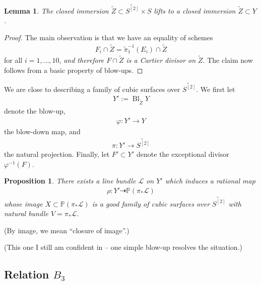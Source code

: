 \documentclass[12 pt]{amsart}
\newtheorem{lemma}{Lemma}[section]
\newtheorem{proposition}{Proposition}[section]
\renewcommand{\P}{\mathbb{P}}
\newcommand{\<}{\left\langle}
\renewcommand{\>}{\right\rangle}
\DeclareMathOperator{\Bl}{Bl}
\begin{document}
\begin{lemma}
  The closed immersion
  $\widetilde{Z} \subset \widetilde{S^{[2]}} \times S$ lifts to a
  closed immersion $\widetilde{Z} \subset Y$.
\end{lemma}

\begin{proof}
  The main observation is that we have an equality of schemes
  \begin{align}
    \label{eq:Cartier}
    F_i \cap \widetilde{Z} = \widetilde{\pi}_{1}^{-1}(E_i) \cap \widetilde{Z}
  \end{align}
  for all $i=1, \dots, 10$, {\sl and therefore $F \cap \widetilde{Z}$
    is a Cartier divisor on $\widetilde{Z}$}. The claim now follows
  from a basic property of blow-ups.
\end{proof}



We are close to describing a family of cubic surfaces over
$\widetilde{S^{[2]}}$.  We first let
\begin{align}
  \label{eq:XB3}
  Y' := \Bl_{\widetilde{Z}}Y
\end{align}
denote the blow-up,
\begin{align}
  \label{eq:phiB3}
  \varphi: Y' \to Y
\end{align}
the blow-down map, and
\begin{align}
  \label{eq:piB3}
  \pi: Y' \to \widetilde{S^{[2]}}
\end{align}
the natural projection. Finally, let $F' \subset Y'$ denote the
exceptional divisor $\varphi^{-1}(F)$.
\begin{proposition}
  \label{proposition:resolv-b3}
  There exists a line bundle $\mathcal{L}$ on $Y'$ which induces a
  rational map
  \begin{align*}
    \rho: Y' \dashrightarrow \P(\pi_{*}\mathcal{L})
  \end{align*}
  whose image $X \subset \P(\pi_{*}\mathcal{L})$ is a good family of
  cubic surfaces over $\widetilde{S^{[2]}}$ with natural bundle
  $V = \pi_{*} \mathcal{L}$.
\end{proposition}

(By image, we mean ``closure of image''.)

(This one I still am confident in -- one simple blow-up resolves the situation.)


\subsection{Relation $B_3$}
\label{sec:relation-b_3}
\end{document}
